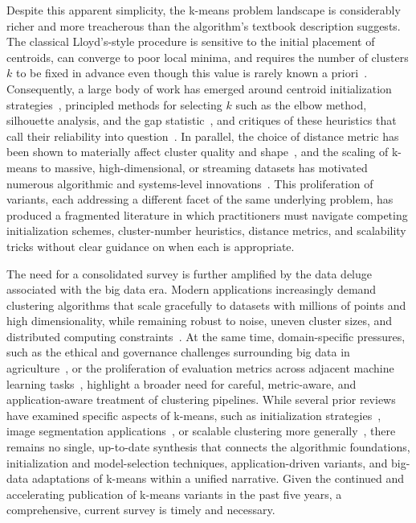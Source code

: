 Despite this apparent simplicity, the k-means problem landscape is considerably richer and more treacherous than the algorithm's textbook description suggests. The classical Lloyd's-style procedure is sensitive to the initial placement of centroids, can converge to poor local minima, and requires the number of clusters $k$ to be fixed in advance even though this value is rarely known a priori~\cite{celebi2012comparative,harris2022extensive}. Consequently, a large body of work has emerged around centroid initialization strategies~\cite{agha2012efficient,bhavani2022efficient,li2018experiment,franti2019how}, principled methods for selecting $k$ such as the elbow method, silhouette analysis, and the gap statistic~\cite{yuan2019research,syakur2018integration,shi2021quantitative,saputra2020effect}, and critiques of these heuristics that call their reliability into question~\cite{schubert2023stop}. In parallel, the choice of distance metric has been shown to materially affect cluster quality and shape~\cite{ghazal2021performances,raeisi2022distance}, and the scaling of k-means to massive, high-dimensional, or streaming datasets has motivated numerous algorithmic and systems-level innovations~\cite{jain2014adapting,chen2019big,mussabayev2023comparative,hamalainen2020improving}. This proliferation of variants, each addressing a different facet of the same underlying problem, has produced a fragmented literature in which practitioners must navigate competing initialization schemes, cluster-number heuristics, distance metrics, and scalability tricks without clear guidance on when each is appropriate.

The need for a consolidated survey is further amplified by the data deluge associated with the big data era. Modern applications increasingly demand clustering algorithms that scale gracefully to datasets with millions of points and high dimensionality, while remaining robust to noise, uneven cluster sizes, and distributed computing constraints~\cite{mahdi2021scalable,awad2022improved,xie2020improvement,mussabayev2025bimodalclust}. At the same time, domain-specific pressures, such as the ethical and governance challenges surrounding big data in agriculture~\cite{carbonell2016ethics,wolfert2017big}, or the proliferation of evaluation metrics across adjacent machine learning tasks~\cite{terven2025comprehensive,lee2023survey,bi2024inconsistency}, highlight a broader need for careful, metric-aware, and application-aware treatment of clustering pipelines. While several prior reviews have examined specific aspects of k-means, such as initialization strategies~\cite{celebi2012comparative,harris2022extensive}, image segmentation applications~\cite{mukherjee2025survey,sattarov2023unveiling}, or scalable clustering more generally~\cite{mahdi2021scalable}, there remains no single, up-to-date synthesis that connects the algorithmic foundations, initialization and model-selection techniques, application-driven variants, and big-data adaptations of k-means within a unified narrative. Given the continued and accelerating publication of k-means variants in the past five years, a comprehensive, current survey is timely and necessary.

